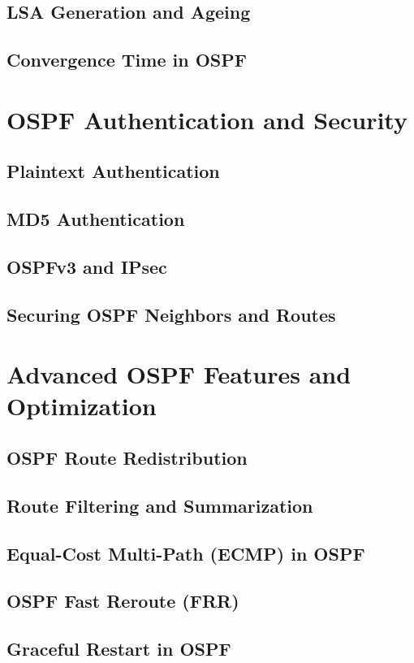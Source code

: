 \documentclass{book}
\begin{document}
    \section{LSA Generation and Ageing}
    \section{Convergence Time in OSPF}
    
\chapter{OSPF Authentication and Security}
    \section{Plaintext Authentication}
    \section{MD5 Authentication}
    \section{OSPFv3 and IPsec}
    \section{Securing OSPF Neighbors and Routes}
    
\chapter{Advanced OSPF Features and Optimization}
    \section{OSPF Route Redistribution}
    \section{Route Filtering and Summarization}
    \section{Equal-Cost Multi-Path (ECMP) in OSPF}
    \section{OSPF Fast Reroute (FRR)}
    \section{Graceful Restart in OSPF}
\end{document}
